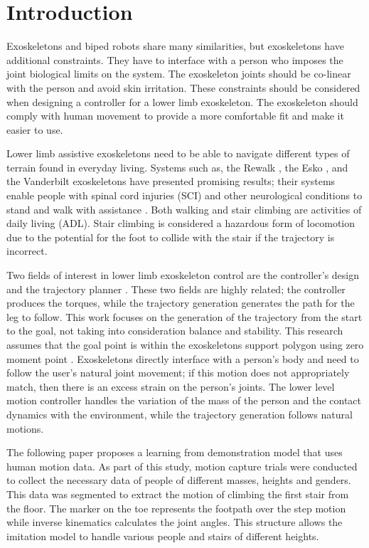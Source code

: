 \section{Introduction}
Exoskeletons and biped robots share many similarities, but exoskeletons have additional constraints. They have to interface with a person who imposes the joint biological limits on the system. The exoskeleton joints should be co-linear with the person and avoid skin irritation. These constraints should be considered when designing a controller for a lower limb exoskeleton. The exoskeleton should comply with human movement to provide a more comfortable fit and make it easier to use.

Lower limb assistive exoskeletons need to be able to navigate different types of terrain found in everyday living. Systems such as, the Rewalk \cite{esquenazi2012rewalk}, the Esko \cite{mertz2012next}, and the Vanderbilt exoskeletons \cite{gasser2017design} have presented promising results; their systems enable people with spinal cord injuries (SCI) and other neurological conditions to stand and walk with assistance \cite{farris2013preliminary}. Both walking and stair climbing are activities of daily living (ADL). Stair climbing is considered a hazardous form of locomotion \cite{HicksLittle2011LowerEJ}  due to the potential for the foot to collide with the stair if the trajectory is incorrect. 

Two fields of interest in lower limb exoskeleton control are the controller's design and the trajectory planner \cite{huang2016optimisation}. These two fields are highly related; the controller produces the torques, while the trajectory generation generates the path for the leg to follow. This work focuses on the generation of the trajectory from the start to the goal, not taking into consideration balance and stability. This research assumes that the goal point is within the exoskeletons support polygon using zero moment point \cite{kajita2003biped}. Exoskeletons directly interface with a person's body and need to  follow the user’s natural joint movement; if this motion does not appropriately match, then there is an excess strain on the person’s joints. The lower level motion controller handles the variation of the mass of the person and the contact dynamics with the environment, while the trajectory generation follows natural motions.

The following paper proposes a learning from demonstration model that uses human motion data. As part of this study, motion capture trials were conducted to collect the necessary data of people of different masses, heights and genders. This data was segmented to extract the motion of climbing the first stair from the floor. The marker on the toe represents the footpath over the step motion while inverse kinematics calculates the joint angles. This structure allows the imitation model to handle various people and stairs of different heights.

